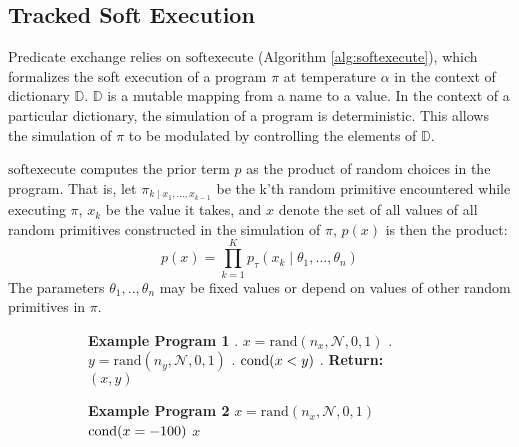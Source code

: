 \subsection{Tracked Soft Execution}
Predicate exchange relies on $\textrm{softexecute}$
(Algorithm \ref{alg:softexecute}), which formalizes the soft execution of a program $\pi$  at temperature $\alpha$ in the context of dictionary $\mathbb{D}$.
$\mathbb{D}$ is a mutable mapping from a name to a value.
In the context of a particular dictionary, the simulation of a program is deterministic.
This allows the simulation of $\pi$ to be modulated by controlling the elements of $\mathbb{D}$.


$\textrm{softexecute}$ computes the prior term $p$ as the product of random choices in the program. 
That is, let $\pi_{k \mid x_1, ..., x_{k-1}}$ be the k'th random primitive encountered while executing $\pi$, $x_k$ be the value it takes, and $x$ denote the set of all values of all random primitives constructed in the simulation of $\pi$, $p(x)$ is then the product:
\begin{equation}\label{productprob}
p(x) = \prod_{k=1}^K p_\tau(x_k \mid \theta_1,..., \theta_n )
\end{equation}
The parameters $\theta_1,..,\theta_n$ may be fixed values or depend on values of other random primitives in $\pi$.



\begin{figure}[tb]
  \centering
  \begin{subfigure}[t]{4cm}
    \vskip 0pt
      \begin{algorithmic}
      \STATE \textbf{Example Program 1}
      . $x = \textrm{rand}(n_x, \mathcal{N}, 0, 1)$
      . $y = \textrm{rand}(n_y, \mathcal{N}, 0, 1)$
      . $\operatorname{cond}(x < y)$
      . {\bfseries Return:} $(x, y)$
      \end{algorithmic}
  \end{subfigure}%
  \hfill
  \begin{subfigure}[t]{4cm}
    \vskip 0pt
      \begin{algorithmic}
      \STATE \textbf{Example Program 2}
      \STATE $x = \textrm{rand}(n_x, \mathcal{N}, 0, 1)$
      \STATE $\operatorname{cond}(x = -100)$
      \ENDIF
       $x$
      \end{algorithmic}
  \end{subfigure}
\end{figure}

